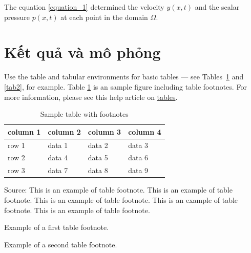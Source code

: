 The equation \eqref{equation_1} determined the velocity $y(x,t)$ and the scalar pressure $p(x,t)$ at each point in the domain $\Omega$. \lipsum[4]


\section{Kết quả và mô phỏng}
Use the table and tabular environments for basic tables --- see Tables~\ref{tab1} and \ref{tab2}, for example. Table \ref{tab1} is an sample figure including table footnotes. For more information, please see this help article on \href{https://www.overleaf.com/learn/latex/tables}{tables}. 

\begin{table}[!ht]
\caption{Sample table with footnotes\label{tab1}}
\begin{threeparttable}
\begin{tabular*}{\columnwidth}{@{\extracolsep\fill}llll@{\extracolsep\fill}}
\toprule
column 1 & column 2 & column 3 & column 4\\
\midrule
row 1 & data 1 & data 2 & data 3 \\
row 2 & data 4 & data 5\tnote{1} & data 6 \\
row 3 & data 7 & data 8 & data 9\tnote{2} \\
\bottomrule
\end{tabular*}
\begin{tablenotes}
\item Source: This is an example of table footnote. This is an example of table footnote. This is an example of table footnote. This is an example of table footnote. This is an example of table footnote.
\item[1] Example of a first table footnote.
\item[2] Example of a second table footnote.
\end{tablenotes}
\end{threeparttable}
\end{table}

